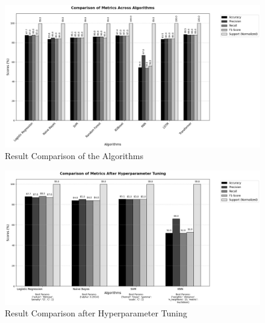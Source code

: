 \pagebreak

\begin{figure}[h!]  
    \centering
    \includegraphics[width=1.0\textwidth]{Images/ML GRAPH 1.png}  
    \caption*{Result Comparison of the Algorithms}
    \label{dfdl145}  %
\end{figure}

\begin{figure}[h!]  
    \centering
    \includegraphics[width=1.0\textwidth]{Images/ML GRAPH 2 HT.png}  
    \caption*{Result Comparison after Hyperparameter Tuning}
    \label{dfdl123}  %
\end{figure}

\pagebreak

